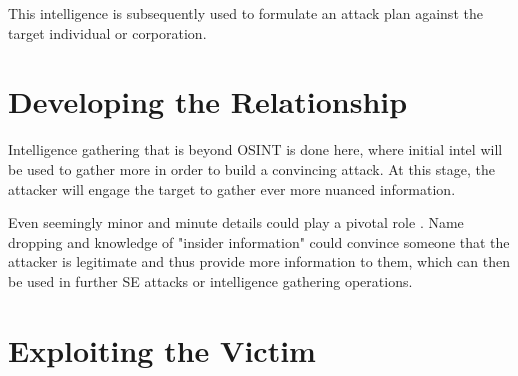 This intelligence is subsequently used to formulate an attack plan against the target individual or corporation.





\section{Developing the Relationship}
\begin{comment}
    
    - Engaging the target with the gathered info and fabricated pretext
    - Choosing the right timing
    - Practicing the engagement
    - Creating the strategy for engagement
    - Create a strategy, plan on how to exploit found weaknesses
    - Create a persona, a pretext with a convincing message
    - Choosing the right attack method
    - AI can help craft highly convincing messages, including the development of the persona (pretext)
    - Deepfake tech, chatbots etc
    - AI can analyze and predict the most suitable times and methods for an attack based on gathered intel

\end{comment}



Intelligence gathering that is beyond OSINT is done here, where initial intel will be used to gather more in order to build a convincing attack. At this stage, the attacker will engage the target to gather ever more nuanced information.


Even seemingly minor and minute details could play a pivotal role \citep{mitnickArtDeceptionControlling2003}. Name dropping and knowledge of "insider information" could convince someone that the attacker is legitimate and thus provide more information to them, which can then be used in further SE attacks or intelligence gathering operations.

 





\section{Exploiting the Victim}
\begin{comment}
    
    - 

\end{comment}


